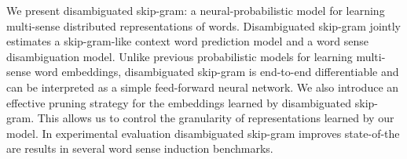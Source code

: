 We present disambiguated skip-gram: a neural-probabilistic model for learning multi-sense distributed representations of words. Disambiguated skip-gram jointly estimates a skip-gram-like context word prediction model and a word sense disambiguation model. Unlike previous probabilistic models for learning multi-sense word embeddings, disambiguated skip-gram is end-to-end differentiable and can be interpreted as a simple feed-forward neural network. We also introduce an effective pruning strategy for the embeddings learned by disambiguated skip-gram. This allows us to control the granularity of representations learned by our model. In experimental evaluation disambiguated skip-gram improves state-of-the are results in several word sense induction benchmarks.
